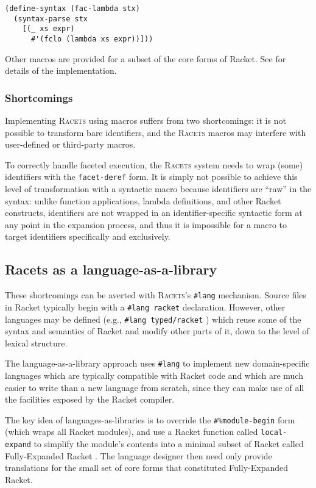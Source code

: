 \documentclass{article}
\begin{document}
\begin{lstlisting}
(define-syntax (fac-lambda stx)
  (syntax-parse stx
    [(_ xs expr)
      #'(fclo (lambda xs expr))]))
\end{lstlisting}

Other macros are provided for a subset of the core forms of Racket. See \cite{racets} for details of the implementation.

\subsubsection{Shortcomings}
Implementing \textsc{Racets} using macros suffers from two shortcomings: it is not possible to transform bare identifiers, and the \textsc{Racets} macros may interfere with user-defined or third-party macros.

To correctly handle faceted execution, the \textsc{Racets} system needs to wrap (some) identifiers with the \texttt{facet-deref} form. It is simply not possible to achieve this level of transformation with a syntactic macro because identifiers are ``raw'' in the syntax: unlike function applications, lambda definitions, and other Racket constructs, identifiers are not wrapped in an identifier-specific syntactic form at any point in the expansion process, and thus it is impossible for a macro to target identifiers specifically and exclusively.

\subsection{Racets as a language-as-a-library}
These shortcomings can be averted with \textsc{Racets}'s \texttt{\#lang} mechanism. Source files in Racket typically begin with a \texttt{\#lang racket} declaration. However, other languages may be defined (e.g., \texttt{\#lang typed/racket} \cite{typed-racket}) which reuse some of the syntax and semantics of Racket and modify other parts of it, down to the level of lexical structure.

The language-as-a-library approach \cite{typed-racket} uses \texttt{\#lang} to implement new domain-specific languages which are typically compatible with Racket code and which are much easier to write than a new language from scratch, since they can make use of all the facilities exposed by the Racket compiler.

The key idea of languages-as-libraries is to override the \texttt{\#\%module-begin} form (which wraps all Racket modules), and use a Racket function called \texttt{local-expand} to simplify the module's contents into a minimal subset of Racket called Fully-Expanded Racket \cite{fe-racket}. The language designer then need only provide translations for the small set of core forms that constituted Fully-Expanded Racket.
\end{document}
